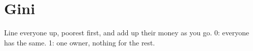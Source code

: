 \section{Gini}

Line everyone up, poorest first, and add up their money as you go.
0: everyone has the same. 1: one owner, nothing for the rest.

\begin{figure}
\end{figure}

